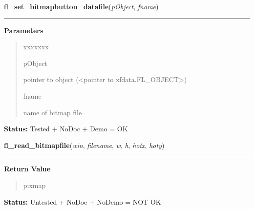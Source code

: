 \hspace{.8\funcindent}\begin{boxedminipage}{\funcwidth}

    \raggedright \textbf{fl\_set\_bitmapbutton\_datafile}(\textit{pObject}, \textit{fname})

    \vspace{-1.5ex}

    \rule{\textwidth}{0.5\fboxrule}
\setlength{\parskip}{2ex}
\setlength{\parskip}{1ex}
      \textbf{Parameters}
      \vspace{-1ex}

      \begin{quote}
        \begin{Ventry}{xxxxxxx}

          \item[pObject]

          pointer to object ({\textless}pointer to 
          xfdata.FL\_OBJECT{\textgreater})

          \item[fname]

          name of bitmap file

        \end{Ventry}

      \end{quote}

\textbf{Status:} Tested + NoDoc + Demo = OK



    \end{boxedminipage}

    \label{xformslib:library:fl_read_bitmapfile}

    \vspace{0.5ex}

\hspace{.8\funcindent}\begin{boxedminipage}{\funcwidth}

    \raggedright \textbf{fl\_read\_bitmapfile}(\textit{win}, \textit{filename}, \textit{w}, \textit{h}, \textit{hotx}, \textit{hoty})

    \vspace{-1.5ex}

    \rule{\textwidth}{0.5\fboxrule}
\setlength{\parskip}{2ex}
\setlength{\parskip}{1ex}
      \textbf{Return Value}
    \vspace{-1ex}

      \begin{quote}
      pixmap

      \end{quote}

\textbf{Status:} Untested + NoDoc + NoDemo = NOT OK



    \end{boxedminipage}

